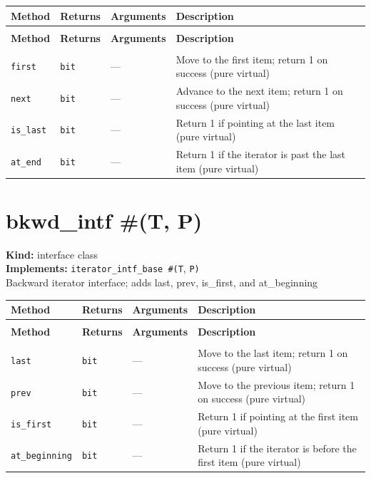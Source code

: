 \documentclass[11pt,letterpaper]{report}
\begin{document}
\begin{xltabular}{\linewidth}{>{\small}p{1.35in} >{\small}p{1.25in} >{\small}p{0.95in} >{\small}X}
\toprule
\textbf{Method} & \textbf{Returns} & \textbf{Arguments} & \textbf{Description} \\
\midrule
\endfirsthead
{} \\
\midrule
\textbf{Method} & \textbf{Returns} & \textbf{Arguments} & \textbf{Description} \\
\midrule
\endhead
\midrule
{} \\
\endfoot
\bottomrule
\endlastfoot
\texttt{first} & \texttt{bit} & --- & Move to the first item; return 1 on success (pure virtual) \\
\texttt{next} & \texttt{bit} & --- & Advance to the next item; return 1 on success (pure virtual) \\
\texttt{is\_last} & \texttt{bit} & --- & Return 1 if pointing at the last item (pure virtual) \\
\texttt{at\_end} & \texttt{bit} & --- & Return 1 if the iterator is past the last item (pure virtual) \\
\end{xltabular}

\section{bkwd\_intf \#(T, P)}
\label{cls:bkwdintfTP}

\noindent\textbf{Kind:} interface class\\
\noindent\textbf{Implements:} \texttt{iterator\_intf\_base \#(T}, \texttt{P)}\\
\noindent Backward iterator interface; adds last, prev, is\_first, and at\_beginning

\begin{xltabular}{\linewidth}{>{\small}p{1.35in} >{\small}p{1.25in} >{\small}p{0.95in} >{\small}X}
\toprule
\textbf{Method} & \textbf{Returns} & \textbf{Arguments} & \textbf{Description} \\
\midrule
\endfirsthead
{} \\
\midrule
\textbf{Method} & \textbf{Returns} & \textbf{Arguments} & \textbf{Description} \\
\midrule
\endhead
\midrule
{} \\
\endfoot
\bottomrule
\endlastfoot
\texttt{last} & \texttt{bit} & --- & Move to the last item; return 1 on success (pure virtual) \\
\texttt{prev} & \texttt{bit} & --- & Move to the previous item; return 1 on success (pure virtual) \\
\texttt{is\_first} & \texttt{bit} & --- & Return 1 if pointing at the first item (pure virtual) \\
\texttt{at\_beginning} & \texttt{bit} & --- & Return 1 if the iterator is before the first item (pure virtual) \\
\end{xltabular}
\end{document}
